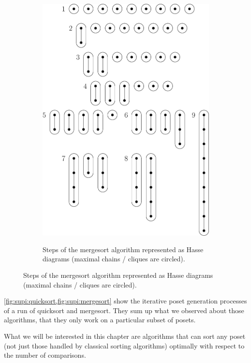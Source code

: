 \begin{figure}
\begin{subfigure}[b]{0.4\textwidth}
{\includegraphics[width=\textwidth]{fig/supi/mergesort}} \caption{Steps of the
mergesort algorithm represented as Hasse diagrams (maximal chains / cliques are
circled).} \label{fig:supi:mergesort} \end{subfigure} \end{figure}


\cref{fig:supi:quicksort,fig:supi:mergesort} show the iterative poset
generation processes of a run of quicksort and mergesort. They sum up what we
observed about those algorithms, that they only work on a particular subset of
posets.

What we will be interested in this chapter are algorithms that can sort any
poset (not just those handled by classical sorting algorithms) optimally with
respect to the number of comparisons.
